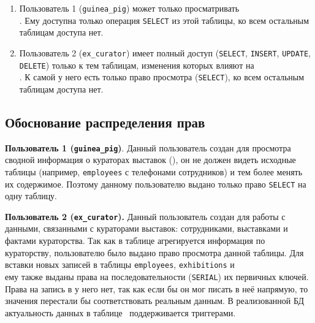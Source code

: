 \vspace{-5pt}

\begin{enumerate}[noitemsep]
    \item Пользователь 1 (\texttt{guinea\_pig}) может только просматривать \\ \TableName{}. Ему доступна только операция \texttt{SELECT} из этой таблицы, ко всем остальным таблицам доступа нет.
    \item Пользователь 2 (\texttt{ex\_curator}) имеет полный доступ (\texttt{SELECT}, \texttt{INSERT}, \texttt{UPDATE}, \texttt{DELETE}) только к тем таблицам, изменения которых влияют на \\\TableName{}. К самой \TableName{} у него есть только право просмотра (\texttt{SELECT}), ко всем остальным таблицам доступа нет.
\end{enumerate}

\subsection{Обоснование распределения прав}

\noindent

\textbf{Пользователь 1 (\texttt{guinea\_pig})}. Данный пользователь создан для просмотра сводной информация о кураторах выставок (\TableName), он не должен видеть исходные таблицы (например, \texttt{employees} с телефонами сотрудников) и тем более менять их содержимое. Поэтому данному пользователю выдано только право \texttt{SELECT} на одну таблицу. \par

\vspace{8pt}

\textbf{Пользователь 2 (\texttt{ex\_curator}).} Данный пользователь создан для работы с данными, связанными с кураторами выставок: сотрудниками, выставками и фактами кураторства. Так как в таблице \TableName{} агрегируется информация по кураторству, пользователю было выдано право просмотра данной таблицы. Для вставки новых записей в таблицы \texttt{employees}, \texttt{exhibitions} и \\ \CuratorsTable{} ему также выданы права на последовательности (\texttt{SERIAL}) их первичных ключей. Права на запись в \TableName{} у него нет, так как если бы он мог писать в неё напрямую, то значения перестали бы соответствовать реальным данным. В реализованной БД актуальность данных в таблице \TableName \, поддерживается триггерами. \par

